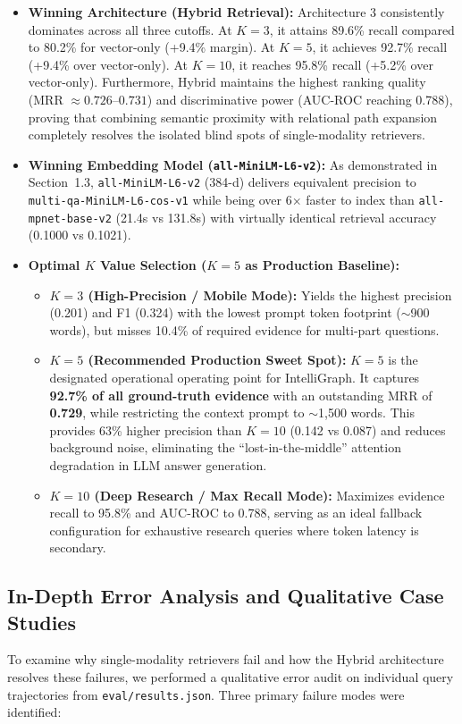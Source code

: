 \documentclass[11pt,a4paper]{article}
\begin{document}
\begin{itemize}[leftmargin=*]
  \item \textbf{Winning Architecture (Hybrid Retrieval):} Architecture 3 consistently dominates across all three cutoffs. At $K=3$, it attains 89.6\% recall compared to 80.2\% for vector-only (+9.4\% margin). At $K=5$, it achieves 92.7\% recall (+9.4\% over vector-only). At $K=10$, it reaches 95.8\% recall (+5.2\% over vector-only). Furthermore, Hybrid maintains the highest ranking quality (MRR $\approx 0.726$--$0.731$) and discriminative power (AUC-ROC reaching 0.788), proving that combining semantic proximity with relational path expansion completely resolves the isolated blind spots of single-modality retrievers.
  \item \textbf{Winning Embedding Model (\texttt{all-MiniLM-L6-v2}):} As demonstrated in Section~1.3, \texttt{all-MiniLM-L6-v2} (384-d) delivers equivalent precision to \texttt{multi-qa-MiniLM-L6-cos-v1} while being over 6$\times$ faster to index than \texttt{all-mpnet-base-v2} (21.4s vs 131.8s) with virtually identical retrieval accuracy (0.1000 vs 0.1021).
  \item \textbf{Optimal $K$ Value Selection ($K=5$ as Production Baseline):}
  \begin{itemize}[nosep]
    \item \textbf{$K=3$ (High-Precision / Mobile Mode):} Yields the highest precision (0.201) and F1 (0.324) with the lowest prompt token footprint ($\sim$900 words), but misses 10.4\% of required evidence for multi-part questions.
    \item \textbf{$K=5$ (Recommended Production Sweet Spot):} $K=5$ is the designated operational operating point for IntelliGraph. It captures \textbf{92.7\% of all ground-truth evidence} with an outstanding MRR of \textbf{0.729}, while restricting the context prompt to $\sim$1,500 words. This provides 63\% higher precision than $K=10$ (0.142 vs 0.087) and reduces background noise, eliminating the ``lost-in-the-middle'' attention degradation in LLM answer generation.
    \item \textbf{$K=10$ (Deep Research / Max Recall Mode):} Maximizes evidence recall to 95.8\% and AUC-ROC to 0.788, serving as an ideal fallback configuration for exhaustive research queries where token latency is secondary.
  \end{itemize}
\end{itemize}

\subsection{In-Depth Error Analysis and Qualitative Case Studies}
To examine why single-modality retrievers fail and how the Hybrid architecture resolves these failures, we performed a qualitative error audit on individual query trajectories from \texttt{eval/results.json}. Three primary failure modes were identified:
\end{document}

